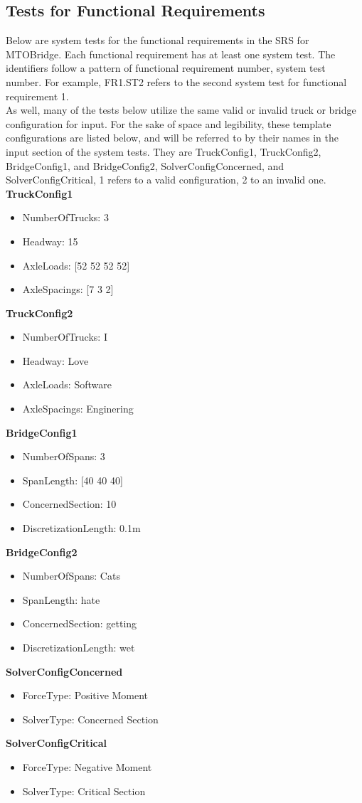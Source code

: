 \documentclass[12pt, titlepage]{article}
\begin{document}
\subsection{Tests for Functional Requirements}

Below are system tests for the functional requirements in the SRS for MTOBridge.
Each functional requirement has at least one system test. The identifiers follow a pattern of
functional requirement number, system test number. For example, FR1.ST2 refers to the second
system test for functional requirement 1.\\
As well, many of the tests below utilize the same valid or invalid truck or bridge configuration for input. For the sake of space and legibility, these template configurations
are listed below, and will be referred to by their names in the input section of the system tests. They are TruckConfig1, TruckConfig2, BridgeConfig1, and BridgeConfig2, 
SolverConfigConcerned, and SolverConfigCritical,
1 refers to a valid configuration, 2 to an invalid one.\\
\textbf{TruckConfig1}
\begin{itemize}
\item NumberOfTrucks: 3
\item Headway: 15
\item AxleLoads: [52 52 52 52]
\item AxleSpacings: [7 3 2]
\end{itemize}
\textbf{TruckConfig2}
\begin{itemize}
\item NumberOfTrucks: I
\item Headway: Love
\item AxleLoads: Software
\item AxleSpacings: Enginering 
\end{itemize}
\textbf{BridgeConfig1}
\begin{itemize}
\item NumberOfSpans: 3 
\item SpanLength: [40 40 40]
\item ConcernedSection: 10
\item DiscretizationLength: 0.1m
\end{itemize}
\textbf{BridgeConfig2}
\begin{itemize}
\item NumberOfSpans: Cats  
\item SpanLength: hate
\item ConcernedSection: getting
\item DiscretizationLength: wet
\end{itemize}
\textbf{SolverConfigConcerned}
\begin{itemize}
\item ForceType: Positive Moment  
\item SolverType: Concerned Section
\end{itemize}
\textbf{SolverConfigCritical}
\begin{itemize}
\item ForceType: Negative Moment  
\item SolverType: Critical Section
\end{itemize}
\end{document}
